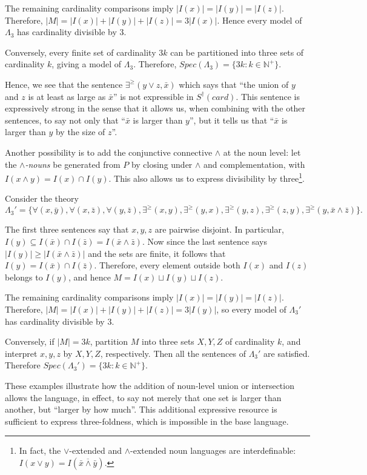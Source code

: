 \documentclass[12pt, reqno]{amsart}
\theoremstyle{definition}
\theoremstyle{remark}
\numberwithin{equation}{section}
\begin{document}
The remaining cardinality comparisons imply $|I(x)|=|I(y)|=|I(z)|.$ Therefore, $|M|
=
|I(x)|+|I(y)|+|I(z)|
=
3|I(x)|.$
Hence every model of $\Lambda_3$ has cardinality divisible by $3$.

Conversely, every finite set of cardinality $3k$ can be partitioned into three sets of cardinality $k$, giving a model of $\Lambda_3$. Therefore, $Spec(\Lambda_3)= \{3k:k\in\mathbb{N}^+\}$.

Hence, we see that the sentence $\exists^{\geq}(y\vee z,\bar x)$ which says that ``the union of $y$ and $z$ is at least as large as $\bar{x}$'' is not expressible in $S^{\dagger}(card)$. This sentence is expressively strong in the sense that it allows us, when combining with the other sentences, to say not only that ``$\bar{x}$ is larger than $y$'', but it tells us that ``$\bar{x}$ is larger than $y$ by the size of $z$''. 

Another possibility is to add the conjunctive connective $\wedge$ at the noun level: let
the \emph{$\wedge$-nouns} be generated from $P$ by closing under $\wedge$ and
complementation, with $I(x \wedge y) = I(x) \cap I(y)$. This also allows us to express
divisibility by three\footnote{In fact, the $\lor$-extended and $\land$-extended noun languages are interdefinable: $I(x\vee y)=I(\overline{\bar{x}\wedge\bar{y}})$.}.


Consider the theory
\[\Lambda_3' =
\{\forall(x,\bar y),\forall(x,\bar z),\forall(y,\bar z),
\exists^{\geq}(x,y),\exists^{\geq}(y,x),
\exists^{\geq}(y,z),\exists^{\geq}(z,y),
\exists^{\geq}(y,\bar x\land\bar z)\}.\]

The first three sentences say that $x,y,z$ are pairwise disjoint. In particular, $I(y)\subseteq I(\bar x)\cap I(\bar z)=I(\bar x\land\bar z)$. Now since the last sentence says $|I(y)|\geq|I(\bar x\land\bar z)|$ and the sets are finite, it follows that $I(y)=I(\bar x)\cap I(\bar z)$. Therefore, every element outside both $I(x)$ and $I(z)$ belongs to $I(y)$, and hence $M=I(x)\sqcup I(y)\sqcup I(z)$.

The remaining cardinality comparisons imply $|I(x)|=|I(y)|=|I(z)|$. Therefore, $|M|=|I(x)|+|I(y)|+|I(z)|=3|I(y)|$, so every model of $\Lambda_3'$ has cardinality divisible by $3$.

Conversely, if $|M|=3k$, partition $M$ into three sets $X,Y,Z$ of cardinality $k$, and interpret $x,y,z$ by $X,Y,Z$, respectively. Then all the sentences of $\Lambda_3'$ are satisfied. Therefore $Spec(\Lambda_3')=\{3k:k\in\mathbb N^+\}$.

These examples illustrate how the addition of noun-level union or intersection allows the language, in effect, to say not merely that one set is larger than another, but ``larger by how much''. This additional expressive resource is sufficient to express three-foldness, which is impossible in the base language.
\end{document}
